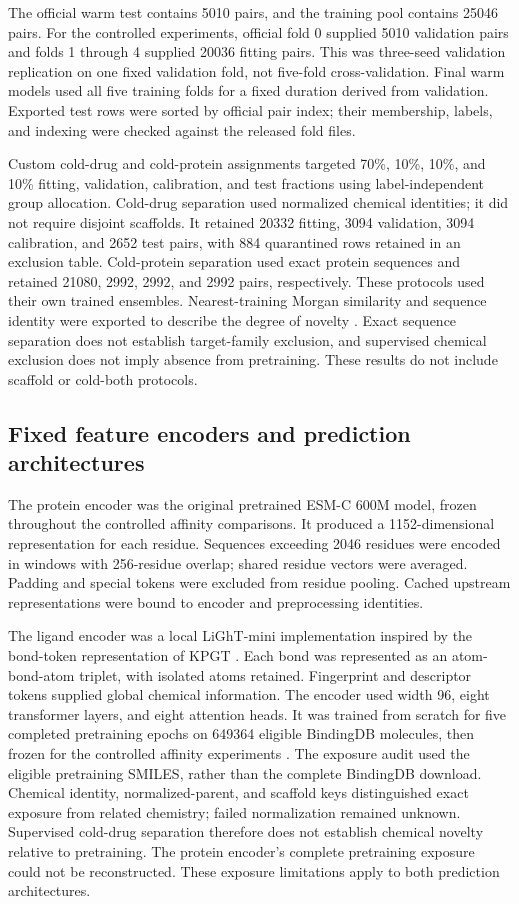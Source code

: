 \documentclass[12pt,a4paper]{article}
\begin{document}
The official warm test contains 5010 pairs, and the training pool contains 25046 pairs. For the controlled experiments, official fold 0 supplied 5010 validation pairs and folds 1 through 4 supplied 20036 fitting pairs. This was three-seed validation replication on one fixed validation fold, not five-fold cross-validation. Final warm models used all five training folds for a fixed duration derived from validation. Exported test rows were sorted by official pair index; their membership, labels, and indexing were checked against the released fold files.

Custom cold-drug and cold-protein assignments targeted 70\%, 10\%, 10\%, and 10\% fitting, validation, calibration, and test fractions using label-independent group allocation. Cold-drug separation used normalized chemical identities; it did not require disjoint scaffolds. It retained 20332 fitting, 3094 validation, 3094 calibration, and 2652 test pairs, with 884 quarantined rows retained in an exclusion table. Cold-protein separation used exact protein sequences and retained 21080, 2992, 2992, and 2992 pairs, respectively. These protocols used their own trained ensembles. Nearest-training Morgan similarity and sequence identity were exported to describe the degree of novelty \citep{morgan2010}. Exact sequence separation does not establish target-family exclusion, and supervised chemical exclusion does not imply absence from pretraining. These results do not include scaffold or cold-both protocols.

\subsection*{Fixed feature encoders and prediction architectures}
The protein encoder was the original pretrained ESM-C 600M model, frozen throughout the controlled affinity comparisons. It produced a 1152-dimensional representation for each residue. Sequences exceeding 2046 residues were encoded in windows with 256-residue overlap; shared residue vectors were averaged. Padding and special tokens were excluded from residue pooling. Cached upstream representations were bound to encoder and preprocessing identities.

The ligand encoder was a local LiGhT-mini implementation inspired by the bond-token representation of KPGT \citep{light2023}. Each bond was represented as an atom-bond-atom triplet, with isolated atoms retained. Fingerprint and descriptor tokens supplied global chemical information. The encoder used width 96, eight transformer layers, and eight attention heads. It was trained from scratch for five completed pretraining epochs on 649364 eligible BindingDB molecules, then frozen for the controlled affinity experiments \citep{bindingdb2007}. The exposure audit used the eligible pretraining SMILES, rather than the complete BindingDB download. Chemical identity, normalized-parent, and scaffold keys distinguished exact exposure from related chemistry; failed normalization remained unknown. Supervised cold-drug separation therefore does not establish chemical novelty relative to pretraining. The protein encoder's complete pretraining exposure could not be reconstructed. These exposure limitations apply to both prediction architectures.
\end{document}
